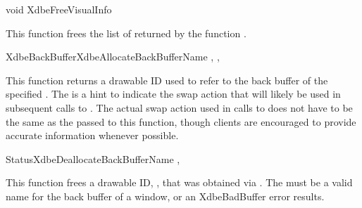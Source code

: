\begin{keeptogether}
\begin{cfunction}{void }{XdbeFreeVisualInfo}
\end{cfunction}

This function frees the list of  returned by
the function .
\end{keeptogether}

\begin{keeptogether}
\begin{cfunction}{XdbeBackBuffer}{XdbeAllocateBackBufferName}
,
,
\end{cfunction}

This function returns a drawable ID used to refer to the back buffer
of the specified .  The  is a
hint to indicate the swap action that will likely be used in
subsequent calls to .  The actual swap
action used in calls to  does not have
to be the same as the  passed to this function,
though clients are encouraged to provide accurate information whenever
possible.
\end{keeptogether}

\begin{keeptogether}
\begin{cfunction}{Status}{XdbeDeallocateBackBufferName}
,
\end{cfunction}

This function frees a drawable ID, , that was obtained
via .  The 
must be a valid name for the back buffer of a window, or an XdbeBadBuffer
error results.
\end{keeptogether}

